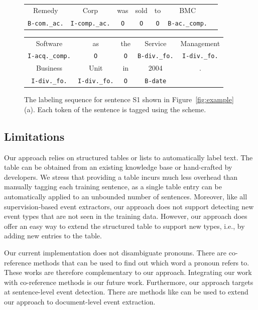 \begin{figure}[t!]
\centering
\scriptsize
\begin{tabular}{ccccccc}
\toprule
Remedy & Corp & was & sold & to & BMC & \\
\rowcolor{Gray} \texttt{B-com.\_ac.} & \texttt{I-comp.\_ac.} & \texttt{O} & \texttt{O} & \texttt{O} & \texttt{B-ac.\_comp.} &\\
\end{tabular}
\begin{tabular}{ccccc}
Software & as & the & Service &Management \\
\rowcolor{Gray} \texttt{I-acq.\_comp.} & \texttt{O} & \texttt{O} & \texttt{B-div.\_fo.} & \texttt{I-div.\_fo.} \\
Business & Unit & in & 2004 &.\\
\rowcolor{Gray} \texttt{I-div.\_fo.} & \texttt{I-div.\_fo.} & \texttt{O} & \texttt{B-date} &\\
\bottomrule
\end{tabular}

\caption{The labeling sequence for sentence S1 shown in Figure~\ref{fig:example} (a). Each token of the sentence is tagged using the \BIO
scheme. \label{fig:ls}}
\end{figure}

\subsection{Limitations}
Our approach relies on structured tables or lists to automatically label text. The table can be obtained from an existing knowledge base or
hand-crafted by developers. We stress that providing a table incurs much less overhead than manually tagging each training sentence, as a
single table entry can be automatically applied to an unbounded number of sentences.  Moreover, like all supervision-based event
extractors, our approach does not support detecting new event types that are not seen in the training data. However, our approach does
offer an easy way to extend the structured table to support new types, i.e., by adding new entries to the table.


Our current implementation does not disambiguate pronouns. There are co-reference methods\FIXME{~\cite{}} that can be used to find out
which word a pronoun refers to. These works are therefore complementary to our approach. Integrating our work with co-reference methods is
our future work. Furthermore, our approach targets at sentence-level event detection. There are methods like \FIXME{\cite{}} can be used to
extend our approach to document-level event extraction.
